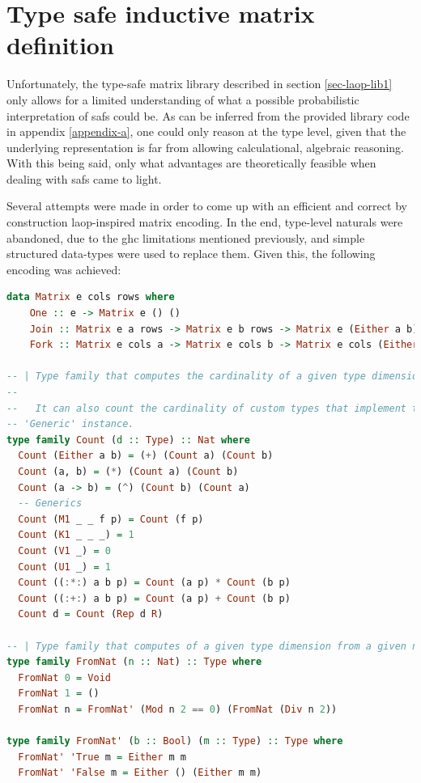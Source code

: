 \documentclass[
  oneside,
  11pt, a4paper,
  footinclude=true,
  headinclude=true,
  cleardoublepage=empty
]{scrbook}
\theoremstyle{definition}
\theoremstyle{definition}
\begin{document}
	\section{Type safe inductive matrix definition}
	    
     Unfortunately, the type-safe matrix library described in section \ref{sec-laop-lib1} only allows for a limited understanding of what a possible probabilistic interpretation of \glspl{saf} could be. As can be inferred from the provided library code in appendix \ref{appendix-a}, one could only reason at the type level, given that the underlying representation is far from allowing calculational, algebraic reasoning. With this being said, only what advantages are theoretically feasible when dealing with \glspl{saf} came to light.
     
     Several attempts were made in order to come up with an efficient and correct by construction \gls{laop}-inspired matrix encoding. In the end, type-level naturals were abandoned, due to the \gls{ghc} limitations mentioned previously, and simple structured data-types were used to replace them. Given this, the following encoding was achieved:
	    
        \begin{lstlisting}[language=Haskell,label={lst:type-fam}, caption={Inductive Matrix definition},captionpos=b]
data Matrix e cols rows where
    One :: e -> Matrix e () ()
    Join :: Matrix e a rows -> Matrix e b rows -> Matrix e (Either a b) rows
    Fork :: Matrix e cols a -> Matrix e cols b -> Matrix e cols (Either a b)

-- | Type family that computes the cardinality of a given type dimension.
--
--   It can also count the cardinality of custom types that implement the
-- 'Generic' instance.
type family Count (d :: Type) :: Nat where
  Count (Either a b) = (+) (Count a) (Count b)
  Count (a, b) = (*) (Count a) (Count b)
  Count (a -> b) = (^) (Count b) (Count a)
  -- Generics
  Count (M1 _ _ f p) = Count (f p)
  Count (K1 _ _ _) = 1
  Count (V1 _) = 0
  Count (U1 _) = 1
  Count ((:*:) a b p) = Count (a p) * Count (b p)
  Count ((:+:) a b p) = Count (a p) + Count (b p)
  Count d = Count (Rep d R)

-- | Type family that computes of a given type dimension from a given natural
type family FromNat (n :: Nat) :: Type where
  FromNat 0 = Void
  FromNat 1 = ()
  FromNat n = FromNat' (Mod n 2 == 0) (FromNat (Div n 2))

type family FromNat' (b :: Bool) (m :: Type) :: Type where
  FromNat' 'True m = Either m m
  FromNat' 'False m = Either () (Either m m)
        \end{lstlisting}{}
	    
\end{document}
